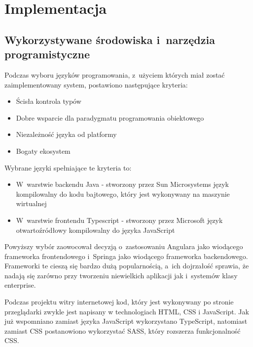 \chapter{Implementacja}\label{ch:implementation}
\section{Wykorzystywane środowiska i~narzędzia programistyczne}\label{sec:dev-tools}

Podczas wyboru języków programowania, z~użyciem których miał zostać zaimplementowany system, postawiono następujące kryteria:

\begin{itemize}
    \item Ścisła kontrola typów
    \item Dobre wsparcie dla paradygmatu programowania obiektowego
    \item Niezależność języka od platformy
    \item Bogaty ekosystem
\end{itemize}

Wybrane języki spełniające te kryteria to:

\begin{itemize}
    \item W~warstwie backendu Java\cite{tech:java} - stworzony przez Sun Microsystems język kompilowalny do kodu bajtowego, który jest wykonywany na maszynie wirtualnej
    \item W~warstwie frontendu Typescript\cite{tech:typescript} - stworzony przez Microsoft język otwartoźródłowy kompilowalny do języka JavaScript\cite{tech:javascript}
\end{itemize}

Powyższy wybór zaowocował decyzją o~zastosowaniu Angulara\cite{tech:angular} jako wiodącego frameworka frontendowego
i~Springa\cite{tech:spring} jako wiodącego frameworka backendowego.
Frameworki te cieszą się bardzo dużą popularnością, a~ich dojrzałość sprawia,
że nadają się zarówno przy tworzeniu niewielkich aplikacji jak i~systemów klasy enterprise.

\par
Podczas projektu witry internetowej kod, który jest wykonywany po stronie przeglądarki zwykle jest napisany w technologiach HTML, CSS\cite{tech:html-css} i JavaScript\cite{tech:javascript}.
Jak już wspomniano zamiast języka JavaScript wykorzystano TypeScript, natomiast zamiast CSS postanowiono wykorzystać SASS\cite{tech:sass}, który rozszerza funkcjonalność CSS.

